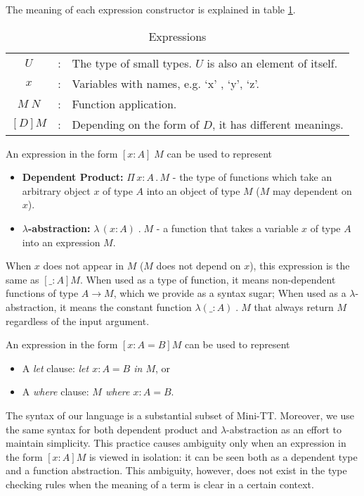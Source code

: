The meaning of each expression constructor is explained in table \ref{tab:exp}.

\begin{table}[h]
  \centering
  \begin{tabular}{c l l}
    $U$ & : & The type of small types. $U$ is also an element of itself.\\
    $x$ & : & Variables with names, e.g. `x' , `y', `z'. \\
    $M \; N$ & : & Function application. \\
    $[D] M$ & : & Depending on the form of $D$, it has different meanings. \\ 
  \end{tabular}
  \caption{Expressions}
  \label{tab:exp}
\end{table}

An expression in the form $[x : A]\; M$ can be used to represent
\begin{itemize}
\item \textbf{Dependent Product:} $\Pi \,x : A \, . \, M$ - the type of functions which take an arbitrary object $x$ of type $A$ into an object of type $M$ ($M$ may dependent on $x$).
\item \textbf{$\lambda$-abstraction:} $\lambda\,(x : A) \; . \; M$ - a function that takes a variable $x$ of type $A$ into an expression $M$.
\end{itemize}

When $x$ does not appear in $M$ ($M$ does not depend on $x$), this expression is the same as $[\_ : A] M$. When used as a type of function, it means non-dependent functions of type $A \to M$, which we provide as a syntax sugar; When used as a $\lambda$-abstraction, it means the constant function $\lambda (\_:A) \; . \; M$ that always return $M$ regardless of the input argument.

An expression in the form $[x : A = B] M$ can be used to represent
\begin{itemize}
\item A \textit{let} clause: \textit{let $x : A = B$ in $M$}, or
\item A \textit{where} clause: \textit{$M$ where $x : A = B$}.
\end{itemize}

The syntax of our language is a substantial subset of Mini-TT. Moreover, we use the same syntax for both dependent product and $\lambda$-abstraction as an effort to maintain simplicity. This practice causes ambiguity only when an expression in the form $[x : A] M$ is viewed in isolation: it can be seen both as a dependent type and a function abstraction. This ambiguity, however, does not exist in the type checking rules when the meaning of a term is clear in a certain context.

